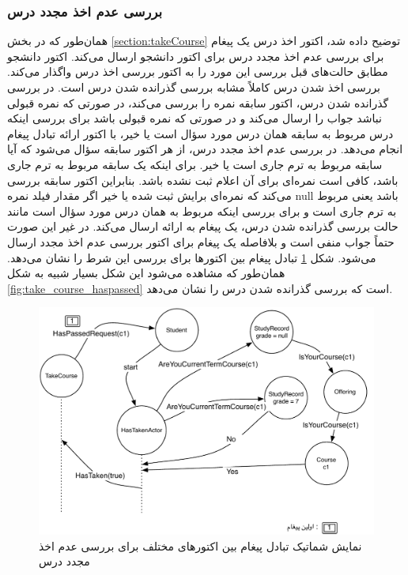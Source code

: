 \FloatBarrier
\subsubsection{بررسی عدم اخذ مجدد درس}
همان‌طور که در بخش \ref{section:takeCourse} توضیح داده شد، اکتور اخذ درس یک پیغام برای بررسی عدم اخذ مجدد درس برای اکتور دانشجو ارسال می‌کند. اکتور دانشجو مطابق حالت‌های قبل بررسی این مورد را به اکتور بررسی اخذ درس واگذار می‌کند. بررسی  اخذ شدن درس کاملاً مشابه بررسی گذرانده شدن درس است. در بررسی گذرانده شدن درس، اکتور سابقه نمره را بررسی می‌کند، در صورتی که نمره قبولی نباشد جواب را ارسال می‌کند و در صورتی که نمره قبولی باشد برای بررسی اینکه درس مربوط به سابقه همان درس مورد سؤال است یا خیر، با اکتور ارائه تبادل پیغام انجام می‌دهد. در بررسی عدم اخذ مجدد درس، از هر اکتور سابقه سؤال می‌شود که آیا سابقه مربوط به ترم جاری است یا خیر. برای اینکه  یک سابقه مربوط به ترم جاری باشد، کافی است نمره‌ای برای آن اعلام ثبت نشده باشد. بنابراین اکتور سابقه بررسی می‌کند که نمره‌ای برایش ثبت شده یا خیر اگر مقدار فیلد نمره null باشد یعنی مربوط به ترم جاری است و برای بررسی اینکه مربوط به همان درس مورد سؤال است مانند حالت بررسی گذرانده شدن درس، یک پیغام به ارائه ارسال می‌کند. در غیر این صورت حتماً جواب منفی است و بلافاصله یک پیغام برای اکتور بررسی عدم اخذ مجدد ارسال می‌شود. شکل  \ref{fig:take_course_taken} تبادل پیغام بین اکتورها برای بررسی این شرط را نشان می‌دهد. همان‌طور که مشاهده می‌شود این شکل بسیار شبیه به شکل \ref{fig:take_course_haspassed} است که بررسی گذرانده شدن درس را نشان می‌دهد.

\begin{figure}[ht]
    \begin{center}
	\includegraphics[width=14cm]{4-ProposedFramework/Figures/HasTaken.pdf}
    \end{center}
    \caption{\label{fig:take_course_taken}نمایش شماتیک تبادل پیغام بین اکتورهای مختلف برای بررسی عدم اخذ مجدد درس }
\end{figure}




